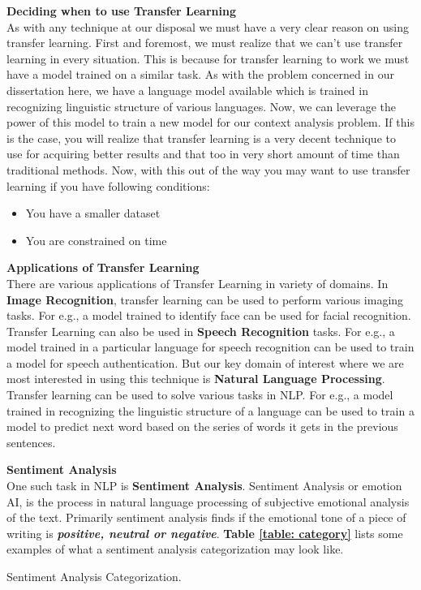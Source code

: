 \documentclass[a4paper, 12pt]{article}
\begin{document}
\begin{sloppypar}
\large \textbf{Deciding when to use Transfer Learning} \\ [0.5ex]
\normalsize
As with any technique at our disposal we must have a very clear reason on using transfer learning. First and foremost, we must realize that we can't use transfer learning in every situation. This is because for transfer learning to work we must have a model trained on a similar task. As with the problem concerned in our dissertation here, we have  a language model available which is trained in recognizing linguistic structure of  various languages. Now, we can leverage the power of this model to train a new model for our context analysis problem. If this is the case, you will realize that transfer learning is a very decent technique to use for acquiring better results and that too in very short amount of time than traditional methods. Now, with this out of the way you may want to use transfer learning if you have following conditions:
\begin{itemize}
\item{You have a smaller dataset}
\item{You are constrained on time}
\end{itemize}

\large \textbf{Applications of Transfer Learning} \\ [0.5ex]
\normalsize
There are various applications of Transfer Learning in variety of domains. In \textbf{Image Recognition}, transfer learning can be used to perform various imaging tasks. For e.g.,  a model trained to identify face can be used for facial recognition. Transfer Learning can also be used in \textbf{Speech Recognition} tasks.  For e.g., a model trained in a particular language for speech recognition can be used to train a model for speech authentication. But our key domain of interest where we are most interested in using this technique is \textbf{Natural Language Processing}. Transfer learning can be used to solve various tasks in  NLP. For e.g., a model trained in recognizing the linguistic structure of a language can be used to train a model to predict next word based on the series of words it gets in the previous sentences.

\large\textbf{Sentiment Analysis} \\ [0.5 ex]
\normalsize
One such task in NLP is \textbf{Sentiment Analysis}. Sentiment Analysis or emotion AI, is the process in natural language processing  of subjective emotional analysis of the text. Primarily sentiment analysis finds if the emotional tone of a piece of writing is \textbf{\textit{positive, neutral or negative}}. \textbf{Table \ref{table: category}} lists some examples of what a sentiment analysis categorization may look like.
\begin{table}[H]
\caption{ Sentiment Analysis Categorization.\label{table: category}}


\end{table}
\end{sloppypar}
\end{document}
